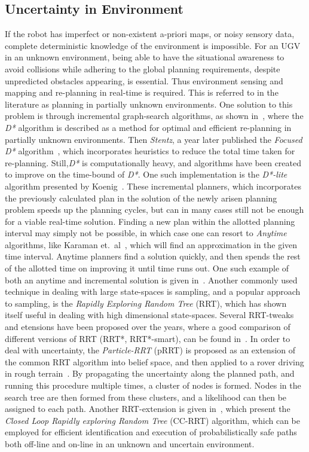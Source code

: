 \subsection{Uncertainty in Environment}
If the robot has imperfect or non-existent a-priori maps, or noisy sensory data,
complete deterministic knowledge of the environment is impossible. For an UGV in
an unknown environment, being able to have the situational awareness to avoid
collisions while adhering to the global planning requirements, despite
unpredicted obstacles appearing, is essential. Thus environment sensing and
mapping and re-planning in real-time is required. This is referred to in the
literature as planning in partially unknown environments. One solution to this
problem is through incremental graph-search algorithms, as shown
in~\cite{Stentz_1997}, where the \textsl{D*} algorithm is described as a method
for optimal and efficient re-planning in partially unknown environments. Then
\textit{Stentz}, a year later published the \textit{Focused D*}
algorithm~\cite{Stentz:1995:FDA:1643031.1643113}, which incorporates heuristics
to reduce the total time taken for re-planning. Still,\textit{D*} is
computationally heavy, and algorithms have been created to improve on the
time-bound of \textit{D*}. One such implementation is the \textit{D*-lite}
algorithm presented by Koenig~\cite{koenig2002d}. These incremental planners,
which incorporates the previously calculated plan in the solution of the newly
arisen planning problem speeds up the planning cycles, but can in many cases
still not be enough for a viable real-time solution. Finding a new plan within
the allotted planning interval may simply not be possible, in which case one can
resort to \textit{Anytime} algorithms, like Karaman et.\
al~\cite{karamanAnytimeMotionPlanning2011}, which will find an approximation in
the given time interval. Anytime planners find a solution quickly, and then
spends the rest of the allotted time on improving it until time runs out. One
such example of both an anytime and incremental solution is given
in~\cite{likhachevAnytimeSearchDynamic2008}. Another commonly used technique in
dealing with large state-spaces is sampling, and a popular approach to sampling,
is the \textit{Rapidly Exploring Random Tree} (RRT), which has shown itself
useful in dealing with high dimensional state-spaces. Several RRT-tweaks and
etensions have been proposed over the years, where a good comparison of
different versions of RRT (RRT*, RRT*-smart), can be found
in~\cite{noreenComparisonRRTRRT2016}. In order to deal with uncertainty, the
\textit{Particle-RRT} (pRRT) is proposed as an extension of the common RRT
algorithm into belief space, and then applied to a rover driving in rough
terrain~\cite{melchiorParticleRRTPath2007}. By propagating the uncertainty along
the planned path, and running this procedure multiple times, a cluster of nodes
is formed. Nodes in the search tree are then formed from these clusters, and a
likelihood can then be assigned to each path. Another RRT-extension is given
in~\cite{Luders_2013}, which present the \textit{Closed Loop Rapidly exploring
  Random Tree} (CC-RRT) algorithm, which can be employed for efficient
identification and execution of probabilistically safe paths both off-line and
on-line in an unknown and uncertain environment.

